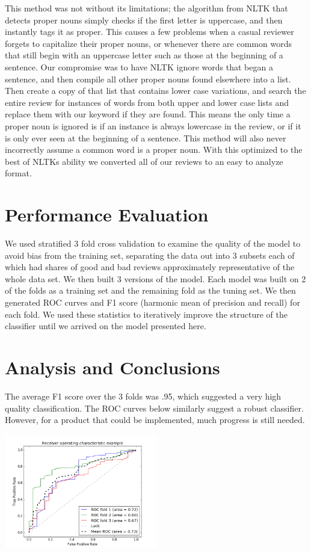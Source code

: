 \documentclass{article}
\newenvironment{Figure}
	{\par\medskip\noindent}
	{\par\medskip}
\begin{document}
\begin{multicols}{2}
This method was not without its limitations; the algorithm from NLTK that detects proper nouns simply checks if the first letter is uppercase, and then instantly tags it as proper. This causes a few problems when a casual reviewer forgets to capitalize their proper nouns, or whenever there are common words that still begin with an uppercase letter such as those at the beginning of a sentence. Our compromise was to have NLTK ignore words that began a sentence, and then compile all other proper nouns found elsewhere into a list. Then create a copy of that list that contains lower case variations, and search the entire review for instances of words from both upper and lower case lists and replace them with our keyword if they are found. This means the only time a proper noun is ignored is if an instance is always lowercase in the review, or if it is only ever seen at the beginning of a sentence. This method will also never incorrectly assume a common word is a proper noun. With this optimized to the best of NLTKs ability we converted all of our reviews to an easy to analyze format.

\section{Performance Evaluation}

We used stratified 3 fold cross validation to examine the quality of the model to avoid bias from the training set, separating the data out into 3 subsets each of which had shares of good and bad reviews approximately representative of the whole data set. We then built 3 versions of the model. Each model was built on 2 of the folds as a training set and the remaining fold as the tuning set. We then generated ROC curves and F1 score (harmonic mean of precision and recall) for each fold. We used these statistics to iteratively improve the structure of the classifier until we arrived on the model presented here.

\section{Analysis and Conclusions}
The average F1 score over the 3 folds was .95, which suggested a very high quality classification. The ROC curves below similarly suggest a robust classifier. However, for a product that could be implemented, much progress is still needed.
\begin{Figure}
	\includegraphics[width=0.5\textwidth]{ROC}
\end{Figure}


\end{multicols}
\end{document}
